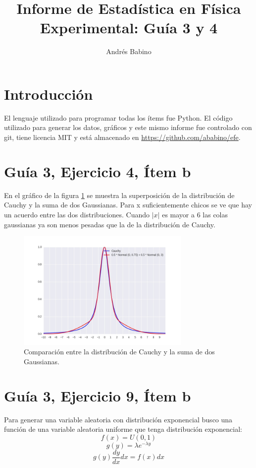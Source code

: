 \documentclass{article}
\title{Informe de Estadística en Física Experimental: Guía 3 y 4}
\author{Andr\'es Babino}
\begin{document}
\maketitle
\section{Introducción}
El lenguaje utilizado para programar todas los ítems fue Python.
El código utilizado para generar los datos, gráficos y este mismo informe fue controlado con git, tiene licencia MIT y está almacenado en \url{https://github.com/ababino/efe}.

\section{Guía 3, Ejercicio 4, Ítem b}
En el gráfico de la figura \ref{fig:ej4b} se muestra la superposición de la distribución de Cauchy y la suma de dos Gaussianas.
Para x suficientemente chicos se ve que hay un acuerdo entre las dos distribuciones. 
Cuando $|x|$ es mayor a $6$ las colas gaussianas ya son menos pesadas que la de la distribución de Cauchy.


\begin{figure}
\centering
\includegraphics[width=0.75\textwidth]{ej4b.jpg}
\caption[]{Comparación entre la distribución de Cauchy y la suma de dos Gaussianas.}
\label{fig:ej4b}
\end{figure}

\section{Guía 3, Ejercicio 9, Ítem b}
Para generar una variable aleatoria con distribución exponencial busco una función de una variable aleatoria uniforme que tenga distribución exponencial:
$$f (x) = U(0, 1)$$
$$ g(y) = \lambda e^{-\lambda y}$$
$$g(y) \frac{dy}{dx} dx= f(x) dx $$
\end{document}
